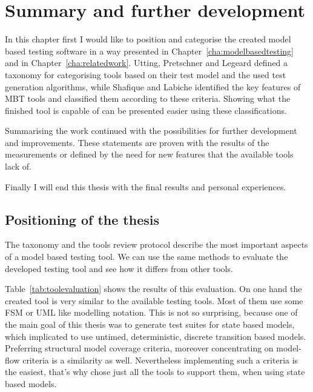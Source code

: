 \chapter{Summary and further development}
\label{cha:summary}

In this chapter first I would like to position and categorise the created model based testing software in a way presented in Chapter~\ref{cha:modelbasedtesting} and in Chapter~\ref{cha:relatedwork}. Utting, Pretschner and Legeard \cite{taxonomy} defined a taxonomy for categorising tools based on their test model and the used test generation algorithms, while Shafique and Labiche identified the key features of MBT tools and classified them according to these criteria. Showing what the finished tool is capable of can be presented easier using these classifications.

Summarising the work continued with the possibilities for further development and improvements. These statements are proven with the results of the measurements or defined by the need for new features that the available tools lack of.

Finally I will end this thesis with the final results and personal experiences.

\section{Positioning of the thesis}
\label{sec:positioning}

The taxonomy and the tools review protocol describe the most important aspects of a model based testing tool. We can use the same methods to evaluate the developed testing tool and see how it differs from other tools.

Table~\ref{tab:toolevaluation} shows the results of this evaluation. On one hand the created tool is very similar to the available testing tools. Most of them use some FSM or UML like modelling notation. This is not so surprising, because one of the main goal of this thesis was to generate test suites for state based models, which implicated to use untimed, deterministic, discrete transition based models. Preferring structural model coverage criteria, moreover concentrating on model-flow criteria is a similarity as well. Nevertheless implementing such a criteria is the easiest, that's why chose just all the tools to support them, when using state based models.

